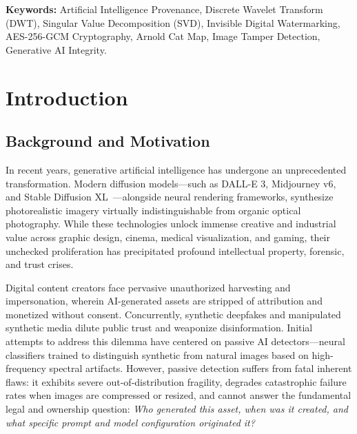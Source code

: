 \documentclass[12pt,a4paper]{report}
\begin{document}
\vspace{0.8cm}
\noindent\textbf{Keywords:} Artificial Intelligence Provenance, Discrete Wavelet Transform (DWT), Singular Value Decomposition (SVD), Invisible Digital Watermarking, AES-256-GCM Cryptography, Arnold Cat Map, Image Tamper Detection, Generative AI Integrity.

\clearpage

\tableofcontents
\clearpage

\listoffigures
\clearpage

\listoftables
\clearpage

\setcounter{page}{1}

\chapter{Introduction}

\section{Background and Motivation}
In recent years, generative artificial intelligence has undergone an unprecedented transformation. Modern diffusion models---such as DALL-E 3, Midjourney v6, and Stable Diffusion XL~\cite{rombach2022high}---alongside neural rendering frameworks, synthesize photorealistic imagery virtually indistinguishable from organic optical photography. While these technologies unlock immense creative and industrial value across graphic design, cinema, medical visualization, and gaming, their unchecked proliferation has precipitated profound intellectual property, forensic, and trust crises.

Digital content creators face pervasive unauthorized harvesting and impersonation, wherein AI-generated assets are stripped of attribution and monetized without consent. Concurrently, synthetic deepfakes and manipulated synthetic media dilute public trust and weaponize disinformation. Initial attempts to address this dilemma have centered on passive AI detectors---neural classifiers trained to distinguish synthetic from natural images based on high-frequency spectral artifacts. However, passive detection suffers from fatal inherent flaws: it exhibits severe out-of-distribution fragility, degrades catastrophic failure rates when images are compressed or resized, and cannot answer the fundamental legal and ownership question: \emph{Who generated this asset, when was it created, and what specific prompt and model configuration originated it?}
\end{document}
